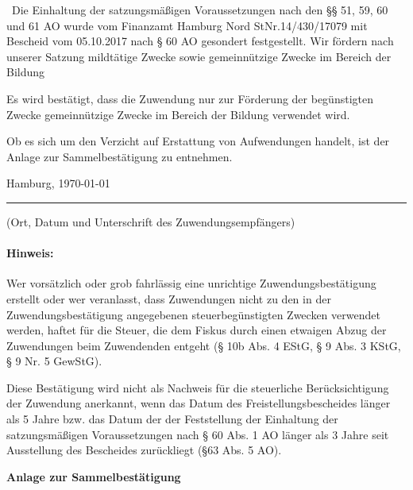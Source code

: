 \documentclass[12pt,ngerman]{scrartcl}
\newcommand{\marked}{\scalebox{1.5}{\XBox}~} %
\begin{document}
{{{\marked Die Einhaltung der satzungsmäßigen Voraussetzungen nach den §§ 51, 59, 60 und 61 AO wurde vom Finanzamt Hamburg Nord StNr.14/430/17079 mit Bescheid vom 05.10.2017 nach § 60 AO gesondert festgestellt. Wir fördern nach unserer Satzung  mildtätige Zwecke sowie gemeinnützige Zwecke im Bereich der Bildung
 
\begin{mdframed}[style=MyFormStyle]%
  Es wird bestätigt, dass die Zuwendung nur zur Förderung der
  begünstigten Zwecke gemeinnützige Zwecke im Bereich der Bildung
  verwendet wird.
\end{mdframed} 

{%

\vspace*{0.5em}Ob es sich um den Verzicht auf Erstattung von Aufwendungen handelt, ist der Anlage zur Sammelbestätigung zu entnehmen. {%

\vspace*{2.5em} 
Hamburg, \today
\hrule

\vspace*{0.5em} (Ort, Datum und Unterschrift des Zuwendungsempfängers) 

\paragraph{Hinweis:} Wer vorsätzlich oder grob fahrlässig eine unrichtige Zuwendungsbestätigung erstellt oder wer veranlasst, dass 
Zuwendungen nicht zu den in der Zuwendungsbestätigung angegebenen steuerbegünstigten Zwecken verwendet 
werden, haftet für die Steuer, die dem Fiskus durch einen etwaigen Abzug der Zuwendungen beim Zuwendenden entgeht (§ 10b Abs. 4 EStG, § 9 Abs. 3 KStG, § 9 Nr. 5 GewStG). 

Diese Bestätigung wird nicht als Nachweis für die steuerliche Berücksichtigung der Zuwendung anerkannt, wenn das Datum des Freistellungsbescheides länger als 5 Jahre bzw. das Datum der der Feststellung der Einhaltung der satzungsmäßigen Voraussetzungen nach § 60 Abs. 1 AO länger als 3 Jahre seit Ausstellung des Bescheides zurückliegt (§63 Abs. 5 AO). 

{%
\clearpage

{\bfseries\large Anlage zur Sammelbestätigung} \vspace*{2em}

}}}}}}
\end{document}
